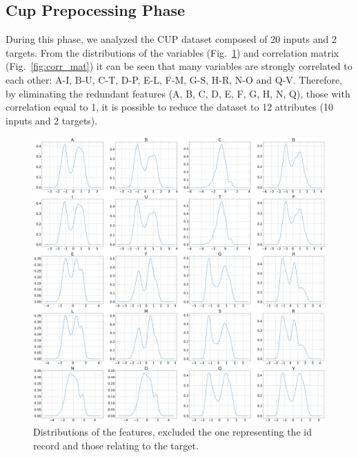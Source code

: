 \begin{appendices}
\section{Cup Prepocessing Phase}
\label{appendix:preprop}
During this phase, we analyzed the CUP dataset composed of 20 inputs and 2 targets. From the distributions of the variables (Fig.~\ref{fig:dis}) and correlation matrix (Fig.~\ref{fig:corr_mat}) it can be seen that many variables are strongly correlated to each other: A-I, B-U, C-T, D-P, E-L, F-M, G-S, H-R, N-O and Q-V. Therefore, by eliminating the redundant features (A, B, C, D, E, F, G, H, N, Q), those with correlation equal to 1, it is possible to reduce the dataset to 12 attributes (10 inputs and 2 targets).
\begin{figure}[H]
    \centering
    \includegraphics[scale = 0.16]{Images/preprocessing_phase/distributions_2.eps}
    \caption{Distributions of the features, excluded the one representing the id record and those relating to the target.}
    \label{fig:dis}
\end{figure}
\begin{figure}[H]
    \centering

\end{figure}
\end{appendices}
